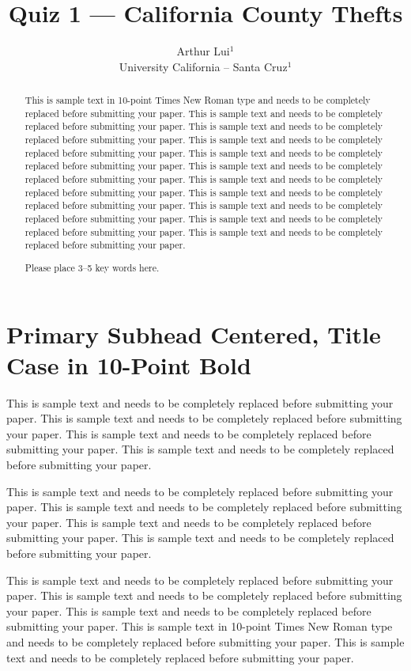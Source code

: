 \documentclass{../../tex_template/asaproc}
\title{Quiz 1 --- California County Thefts}
\author{
  Arthur Lui$^1$\\
  University California -- Santa Cruz$^1$\\
}
\begin{document}
\maketitle


\begin{abstract}
This is sample text in 10-point Times New Roman type and needs to be completely replaced before submitting your paper. This is sample text and needs to be completely replaced before submitting your paper. This is sample text and needs to be completely replaced before submitting your paper. This is sample text and needs to be completely replaced before submitting your paper. This is sample text and needs to be completely replaced before submitting your paper. This is sample text and needs to be completely replaced before submitting your paper. This is sample text and needs to be completely replaced before submitting your paper. This is sample text and needs to be completely replaced before submitting your paper. This is sample text and needs to be completely replaced before submitting your paper. This is sample text and needs to be completely replaced before submitting your paper. This is sample text and needs to be completely replaced before submitting your paper.
\begin{keywords}
Please place 3--5 key words here.
\end{keywords}
\end{abstract}


\section{Primary Subhead Centered, Title Case in 10-Point Bold}

This is sample text and needs to be completely replaced before submitting your paper. This is sample text and needs to be completely replaced before submitting your paper. This is sample text and needs to be completely replaced before submitting your paper. This is sample text and needs to be completely replaced before submitting your paper.

This is sample text and needs to be completely replaced before submitting your paper. This is sample text and needs to be completely replaced before submitting your paper.  This is sample text and needs to be completely replaced before submitting your paper. This is sample text and needs to be completely replaced before submitting your paper.

This is sample text and needs to be completely replaced before submitting your paper. This is sample text and needs to be completely replaced before submitting your paper. This is sample text and needs to be completely replaced before submitting your paper. This is sample text in 10-point Times New Roman type and needs to be completely replaced before submitting your paper. This is sample text and needs to be completely replaced before submitting your paper.
\end{document}
